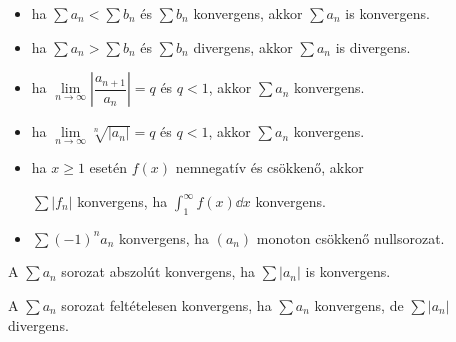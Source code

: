 \documentclass[a4paper, 12pt]{scrartcl}
\begin{document}
\begin{blueBox}
  \begin{itemize}
    \item {}
          \begin{center}
            ha $\sum a_n < \sum b_n$ és $\sum b_n$ konvergens,
            akkor $\sum a_n$ is konvergens.
          \end{center}

    \item {}
          \begin{center}
            ha $\sum a_n > \sum b_n$ és $\sum b_n$ divergens,
            akkor $\sum a_n$ is divergens.
          \end{center}

    \item {}
          \begin{center}
            ha $\lim\limits_{n \to \infty} \left|\dfrac{a_{n+1}}{a_n}\right| = q$ és $q < 1$,
            akkor $\sum a_n$ konvergens.
          \end{center}

    \item {}
          \begin{center}
            ha $\lim\limits_{n \to \infty} \sqrt[n]{|a_n|} = q$ és $q < 1$,
            akkor $\sum a_n$ konvergens.
          \end{center}

    \item {}
          ha $x \geq 1$ esetén $f(x)$ nemnegatív és csökkenő, akkor
          \begin{center}
            $\sum |f_n|$ konvergens,
            ha $\displaystyle\int_{1}^{\infty} f(x) \dd x$ konvergens.
          \end{center}

    \item {}
          \begin{center}
            $\sum (-1)^n a_n$ konvergens, ha $(a_n)$ monoton csökkenő nullsorozat.
          \end{center}
  \end{itemize}
\end{blueBox}

\begin{note}
  A $\sum a_n$ sorozat abszolút konvergens, ha $\sum |a_n|$ is konvergens.

  A $\sum a_n$ sorozat feltételesen konvergens, ha $\sum a_n$ konvergens, de
  $\sum |a_n|$ divergens.
\end{note}
\end{document}
